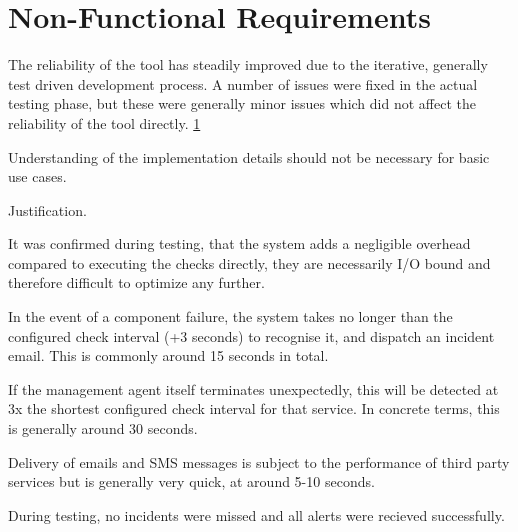 \documentclass{cshonours}
\begin{document}
\section{Non-Functional Requirements}
\begin{enumerate}

    The reliability of the tool has steadily improved due to the iterative, generally test driven development process. A number of issues were fixed in the actual testing phase, but these were generally minor issues which did not affect the reliability of the tool directly. \ref{}

   Understanding of the implementation details should not be necessary for basic use cases.

    Justification.

    \begin{enumerate}

        It was confirmed during testing, that the system adds a negligible overhead compared to executing the checks directly, they are necessarily I/O bound and therefore difficult to optimize any further.


        In the event of a component failure, the system takes no longer than the configured check interval (+3 seconds) to recognise it, and dispatch an incident email. This is commonly around 15 seconds in total.

        If the management agent itself terminates unexpectedly, this will be detected at 3x the shortest configured check interval for that service. In concrete terms, this is generally around 30 seconds.
        
        Delivery of emails and SMS messages is subject to the performance of third party services but is generally very quick, at around 5-10 seconds.

        During testing, no incidents were missed and all alerts were recieved successfully.



\end{enumerate}
\end{enumerate}
\end{document}
